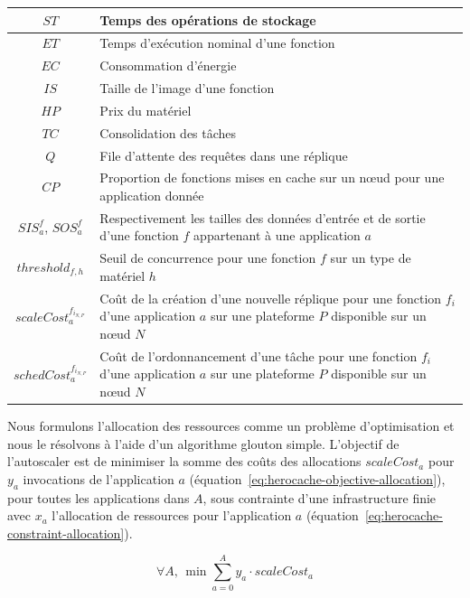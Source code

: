 \begin{table}[!ht]
\begin{center}
{\begin{tabularx}{\linewidth}{|c|Y|}
            $ST$ & Temps des opérations de stockage \\ \hline
            $ET$ & Temps d'exécution nominal d'une fonction \\ \hline
            $EC$ & Consommation d'énergie \\ \hline
            $IS$ & Taille de l'image d'une fonction \\ \hline
            $HP$ & Prix du matériel \\ \hline
            $TC$ & Consolidation des tâches \\ \hline
            $Q$ & File d'attente des requêtes dans une réplique \\ \hline
            $CP$ & Proportion de fonctions mises en cache sur un nœud pour une application donnée \\ \hline
            $SIS^{f}_{a}$, $SOS^{f}_{a}$ & Respectivement les tailles des données d'entrée et de sortie d'une fonction $f$ appartenant à une application $a$ \\ \hline
            $threshold_{f, h}$ & Seuil de concurrence pour une fonction $f$ sur un type de matériel $h$ \\ \hline
            $scaleCost^{{f}_{{i}_{N, P}}}_a$ & Coût de la création d'une nouvelle réplique pour une fonction $f_i$ d'une application $a$ sur une plateforme $P$ disponible sur un nœud $N$ \\ \hline
            $schedCost^{{f}_{{i}_{N, P}}}_a$ & Coût de l'ordonnancement d'une tâche pour une fonction $f_i$ d'une application $a$ sur une plateforme $P$ disponible sur un nœud $N$ \\ \hline
        \end{tabularx}
    }
    \label{table:herocache-notation}
    \end{center}
\end{table}

Nous formulons l'allocation des ressources comme un problème d'optimisation et nous le résolvons à l'aide d'un algorithme glouton simple. L'objectif de l'autoscaler est de minimiser la somme des coûts des allocations $scaleCost_{a}$ pour $y_a$ invocations de l'application $a$ (équation~\ref{eq:herocache-objective-allocation}), pour toutes les applications dans $A$, sous contrainte d'une infrastructure finie avec $x_a$ l'allocation de ressources pour l'application $a$ (équation~\ref{eq:herocache-constraint-allocation}).

\begin{equation}
    \forall A, \, \min \sum_{a = 0}^{A} y_a \cdot scaleCost_{a}
\label{eq:herocache-objective-allocation}
\end{equation}

